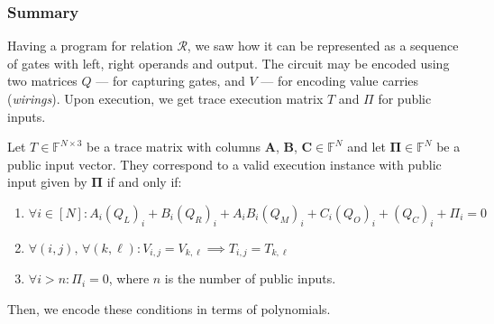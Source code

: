 \documentclass[../../book.tex]{subfiles}
\begin{document}
\subsubsection{Summary}
Having a program for relation $\mathcal{R}$, we saw how it can be represented as
a sequence of gates with left, right operands and output. The circuit may be
encoded using two matrices $Q$ --- for capturing gates, and $V$ --- for encoding
value carries (\textit{wirings}). Upon execution, we get trace execution matrix
$T$ and $\Pi$ for public inputs.

\begin{definition}
Let $T \in \mathbb{F}^{N \times 3}$ be a trace matrix with columns $\mathbf{A}$,
$\mathbf{B}$, $\mathbf{C} \in \mathbb{F}^N$ and let $\boldsymbol{\Pi} \in
\mathbb{F}^N$ be a public input vector. They correspond to a valid execution
instance with public input given by $\boldsymbol{\Pi}$ if and only if:
\begin{enumerate}
    \item \(\forall i \in [N]: A_i(Q_{L})_i + B_i(Q_{R})_i + A_iB_i(Q_{M})_i + C_i(Q_{O})_i + (Q_{C})_i + \Pi_i = 0\)
    \item \(\forall (i, j), \, \forall (k, \ell): V_{i,j} = V_{k,\ell} \implies T_{i,j} = T_{k,\ell}\)
    \item \(\forall i > n: \Pi_i = 0\), where $n$ is the number of public inputs.
\end{enumerate}
\end{definition}

Then, we encode these conditions in terms of polynomials.
\end{document}
